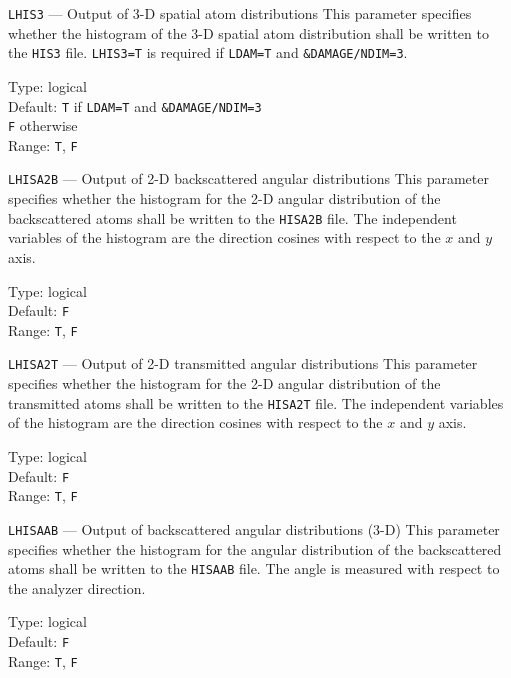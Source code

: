 \begin{keydescription}{\texttt{LHIS3} --- Output of 3-D spatial atom distributions}
%
  This parameter specifies whether the histogram of the 3-D spatial atom
  distribution shall be written to the \texttt{HIS3} file. \texttt{LHIS3=T} is
  required if \texttt{LDAM=T} and \texttt{\&DAMAGE/NDIM=3}.
  \begin{keytab}
    Type:    \> logical \\
    Default: \> \texttt{T} if \texttt{LDAM=T} and \texttt{\&DAMAGE/NDIM=3} \\
             \> \texttt{F} otherwise \\
    Range:   \> \texttt{T}, \texttt{F} 
  \end{keytab}
\end{keydescription}

\begin{keydescription}{\texttt{LHISA2B} --- Output of 2-D backscattered angular distributions}
%
  This parameter specifies whether the histogram for the 2-D angular
  distribution of the backscattered atoms shall be written to the
  \texttt{HISA2B} file. The independent variables of the histogram are the
  direction cosines with respect to the $x$ and $y$ axis.
  \begin{keytab}
    Type:    \> logical \\
    Default: \> \texttt{F} \\
    Range:   \> \texttt{T}, \texttt{F} 
  \end{keytab}
\end{keydescription}

\begin{keydescription}{\texttt{LHISA2T} --- Output of 2-D transmitted angular distributions}
%
  This parameter specifies whether the histogram for the 2-D angular
  distribution of the transmitted atoms shall be written to the
  \texttt{HISA2T} file. The independent variables of the histogram are the
  direction cosines with respect to the $x$ and $y$ axis.
  \begin{keytab}
    Type:    \> logical \\
    Default: \> \texttt{F} \\
    Range:   \> \texttt{T}, \texttt{F} 
  \end{keytab}
\end{keydescription}

\begin{keydescription}{\texttt{LHISAAB} --- Output of backscattered angular distributions (3-D)}
%
  This parameter specifies whether the histogram for the angular distribution of the 
  backscattered atoms shall be written to the \texttt{HISAAB} file. The angle is measured
  with respect to the analyzer direction.
  \begin{keytab}
    Type:    \> logical \\
    Default: \> \texttt{F} \\
    Range:   \> \texttt{T}, \texttt{F} 
  \end{keytab}
\end{keydescription}

